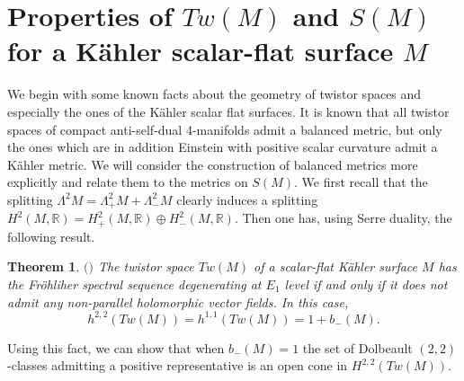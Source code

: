\documentclass[11pt]{amsart}
\theoremstyle{definition}
\theoremstyle{plain}
\newtheorem{Teorema}[Def]{Theorem}
\theoremstyle{definition}
\theoremstyle{plain}
\theoremstyle{remark}
\theoremstyle{plain}
\newcommand{\numberset}{\mathbb}
\newcommand{\R}{\numberset{R}}
\begin{document}
\section{Properties of $Tw(M)$ and $S(M)$ for a K\"ahler scalar-flat surface $M$}
We begin with some known facts about the geometry of twistor spaces and especially the ones of the K\"ahler scalar flat surfaces. 
It is known that all twistor spaces of compact  anti-self-dual 4-manifolds admit a balanced metric, but only the ones which are in addition Einstein with positive scalar curvature admit a K\"ahler metric. We will consider the construction of balanced metrics more explicitly and relate them to the metrics on $S(M)$. We first recall that the splitting $\Lambda^2M=\Lambda^2_+M+\Lambda^2_-M$ clearly induces a splitting $H^2(M, \R)=H^2_+(M, \R)\oplus H^2_-(M, \R)$. Then one has, using Serre duality, the following result.
\begin{Teorema} $($\cite[Theorem 5.3.]{Eastwood-Singer}$)$ The twistor space  $Tw(M)$ of a scalar-flat K\"ahler surface $M$ has the Fr\"ohliher spectral sequence degenerating at $E_1$ level if and only if it does not admit any non-parallel holomorphic vector fields. In this case, $$h^{2,2}(Tw(M)) = h^{1,1}(Tw(M)) = 1+b_-(M).$$
 \end{Teorema}
Using this fact, we can show that when $b_-(M)=1$ the set of Dolbeault $(2,2)$-classes admitting a positive representative is an open cone in $H^{2,2} (Tw(M))$.



\hfill
\end{document}

